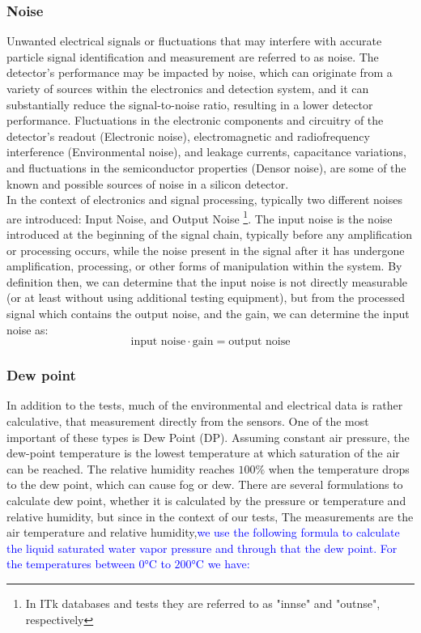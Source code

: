 \subsubsection{Noise}
Unwanted electrical signals or fluctuations that may interfere with accurate particle signal identification and measurement are referred to as noise. The detector's performance may be impacted by noise, which can originate from a variety of sources within the electronics and detection system, and it can substantially reduce the signal-to-noise ratio, resulting in a lower detector performance. Fluctuations in the electronic components and circuitry of the detector's readout (Electronic noise), electromagnetic and radiofrequency interference (Environmental noise), and leakage currents, capacitance variations, and fluctuations in the semiconductor properties (Densor noise), are some of the known and possible sources of noise in a silicon detector.\\
In the context of electronics and signal processing, typically two different noises are introduced: Input Noise, and Output Noise \footnote{In ITk databases and tests they are referred to as "innse" and "outnse", respectively}. The input noise is the noise introduced at the beginning of the signal chain, typically before any amplification or processing occurs, while the noise present in the signal after it has undergone amplification, processing, or other forms of manipulation within the system. By definition then, we can determine that the input noise is not directly measurable (or at least without using additional testing equipment), but from the processed signal which contains the output noise, and the gain, we can determine the input noise as:
\begin{equation*}
    \text{input noise} \cdot \text{gain} = \text{output noise}
\end{equation*}

\subsubsection{Dew point}
In addition to the tests, much of the environmental and electrical data is rather calculative, that measurement directly from the sensors. One of the most important of these types is Dew Point (DP). Assuming constant air pressure, the dew-point temperature is the lowest temperature at which saturation of the air can be reached. The relative humidity reaches $100\%$ when the temperature drops to the dew point, which can cause fog or dew. There are several formulations to calculate dew point, whether it is calculated by the pressure or temperature and relative humidity, but since in the context of our tests, The measurements are the air temperature and relative humidity,\textcolor{blue}{we use the following formula to calculate the liquid saturated water vapor pressure and through that the dew point. For the temperatures between $0\si{\celsius}$ to $200\si{\celsius}$ we have:}


